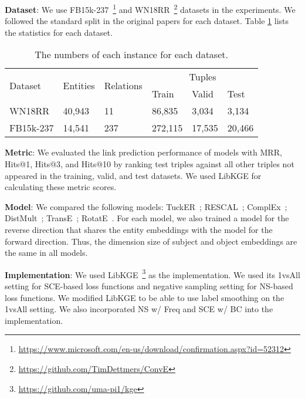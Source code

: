 \noindent\textbf{Dataset}: We use FB15k-237~\cite{toutanova-chen-2015-observed}\footnote{\url{https://www.microsoft.com/en-us/download/confirmation.aspx?id=52312}} and WN18RR~\cite{dettmers2018conve}\footnote{\url{https://github.com/TimDettmers/ConvE}} datasets in the experiments. We followed the standard split in the original papers for each dataset. Table \ref{tab:app:data} lists the statistics for each dataset.
\begin{table}[h!]
    \centering
    \small
    \begin{tabular}{llllll}
    \toprule
    \multirow{2}{*}{Dataset}&\multirow{2}{*}{Entities}&\multirow{2}{*}{Relations}&\multicolumn{3}{c}{Tuples}\\
    \cmidrule(lr){4-6}
 &  &  & Train & Valid & Test\\
    \midrule
WN18RR &40,943 &11 &86,835 &3,034 &3,134\\
FB15k-237 &14,541 &237 &272,115 &17,535& 20,466  \\
\bottomrule
    \end{tabular}
    \caption{The numbers of each instance for each dataset.}
    \label{tab:app:data}
\end{table}

\noindent\textbf{Metric}: We evaluated the link prediction performance of models with MRR, Hits@1, Hits@3, and Hits@10 by ranking test triples against all other triples not appeared in the training, valid, and test datasets. We used LibKGE for calculating these metric scores.

\noindent\textbf{Model}: We compared the following models:
TuckER~\cite{balazevic-etal-2019-tucker}; RESCAL~\cite{10.5555/2900423.2900470}; ComplEx~\cite{DBLP:conf/icml/TrouillonWRGB16}; DistMult~\cite{yang2015embedding}; TransE~\cite{NIPS2013_1cecc7a7}; RotatE~\cite{DBLP:journals/corr/abs-1902-10197}.
For each model, we also trained a model for the reverse direction that shares the entity embeddings with the model for the forward direction. Thus, the dimension size of subject and object embeddings are the same in all models.

\noindent\textbf{Implementation}: We used LibKGE~\cite{libkge}\footnote{\url{https://github.com/uma-pi1/kge}} as the implementation.
We used its 1vsAll setting for SCE-based loss functions and negative sampling setting for NS-based loss functions.
We modified LibKGE to be able to use label smoothing on the 1vsAll setting.
We also incorporated NS w/ Freq and SCE w/ BC into the implementation.

